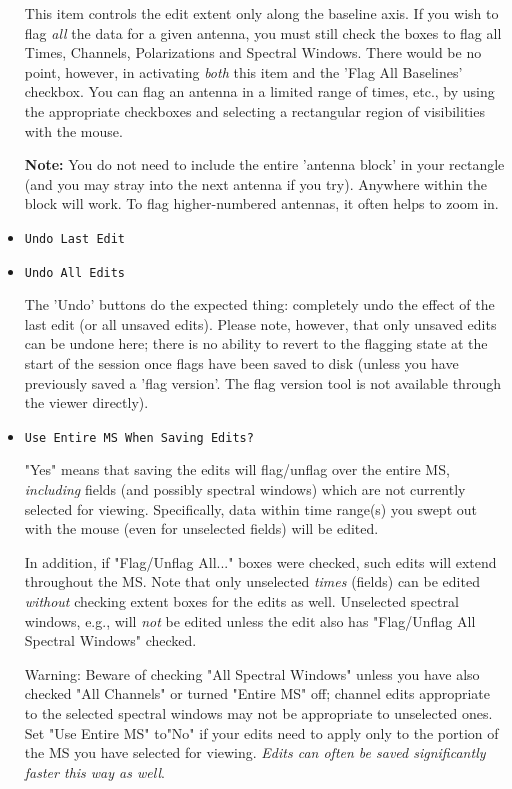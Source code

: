 \begin{itemize}
This item controls the edit extent only along the baseline axis.  If you
wish to flag {\it all} the data for a given antenna, you must still check
the boxes to flag all Times, Channels, Polarizations and Spectral Windows.
There would be no point, however, in activating {\it both} this item and
the 'Flag All Baselines' checkbox.  You can flag an antenna in a limited
range of times, etc., by using the appropriate checkboxes and selecting
a rectangular region of visibilities with the mouse. 

{\bf Note:} You do not need to include the entire 'antenna block' in your
rectangle (and you may stray into the next antenna if you try). Anywhere
within the block will work.  To flag higher-numbered antennas, it often
helps to zoom in.

\item {\tt Undo Last Edit}

\item {\tt Undo All Edits}

The 'Undo' buttons do the expected thing: completely undo the effect of
the last edit (or all unsaved edits).  Please note,
however, that only unsaved edits can be undone here;
there is no ability to revert to the flagging state at the start of the
session once flags have been saved to disk (unless you have previously
saved a 'flag version'.  The flag version tool is not available through
the viewer directly).

\item {\tt Use Entire MS When Saving Edits?}

"Yes" means that saving the edits will flag/unflag over the entire MS,
{\it including} fields (and possibly spectral windows) which are not 
currently selected for viewing.  Specifically, data within time range(s)
you swept out with the mouse (even for unselected fields) will be edited.

In addition, if "Flag/Unflag All..." boxes were checked, such edits will
extend throughout the MS.  Note that only
unselected {\it times} (fields) can be edited {\it without} checking
extent boxes for the edits as well.  Unselected spectral windows, e.g.,
will {\it not} be edited unless the edit also has "Flag/Unflag All
Spectral Windows" checked.  

Warning: Beware of checking "All Spectral Windows" unless you have also 
checked "All Channels" or turned "Entire MS" off; channel edits appropriate 
to the selected spectral windows may not be appropriate to unselected
ones.  Set "Use Entire MS" to"No" if your edits need to apply only to the
portion of the MS you have selected for viewing.  {\it Edits can often be
saved significantly faster this way as well}.


\end{itemize}
